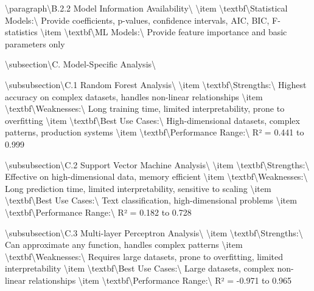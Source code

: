 \documentclass[11pt,a4paper]{article}
\begin{document}
\textbackslash{}paragraph\textbackslash{}{B.2.2 Model Information Availability\textbackslash{}}
\textbackslash{}item \textbackslash{}textbf\textbackslash{}{Statistical Models:\textbackslash{}} Provide coefficients, p-values, confidence intervals, AIC, BIC, F-statistics
\textbackslash{}item \textbackslash{}textbf\textbackslash{}{ML Models:\textbackslash{}} Provide feature importance and basic parameters only

\textbackslash{}subsection\textbackslash{}{C. Model-Specific Analysis\textbackslash{}}

\textbackslash{}subsubsection\textbackslash{}{C.1 Random Forest Analysis\textbackslash{}}
\textbackslash{}item \textbackslash{}textbf\textbackslash{}{Strengths:\textbackslash{}} Highest accuracy on complex datasets, handles non-linear relationships
\textbackslash{}item \textbackslash{}textbf\textbackslash{}{Weaknesses:\textbackslash{}} Long training time, limited interpretability, prone to overfitting
\textbackslash{}item \textbackslash{}textbf\textbackslash{}{Best Use Cases:\textbackslash{}} High-dimensional datasets, complex patterns, production systems
\textbackslash{}item \textbackslash{}textbf\textbackslash{}{Performance Range:\textbackslash{}} R² = 0.441 to 0.999

\textbackslash{}subsubsection\textbackslash{}{C.2 Support Vector Machine Analysis\textbackslash{}}
\textbackslash{}item \textbackslash{}textbf\textbackslash{}{Strengths:\textbackslash{}} Effective on high-dimensional data, memory efficient
\textbackslash{}item \textbackslash{}textbf\textbackslash{}{Weaknesses:\textbackslash{}} Long prediction time, limited interpretability, sensitive to scaling
\textbackslash{}item \textbackslash{}textbf\textbackslash{}{Best Use Cases:\textbackslash{}} Text classification, high-dimensional problems
\textbackslash{}item \textbackslash{}textbf\textbackslash{}{Performance Range:\textbackslash{}} R² = 0.182 to 0.728

\textbackslash{}subsubsection\textbackslash{}{C.3 Multi-layer Perceptron Analysis\textbackslash{}}
\textbackslash{}item \textbackslash{}textbf\textbackslash{}{Strengths:\textbackslash{}} Can approximate any function, handles complex patterns
\textbackslash{}item \textbackslash{}textbf\textbackslash{}{Weaknesses:\textbackslash{}} Requires large datasets, prone to overfitting, limited interpretability
\textbackslash{}item \textbackslash{}textbf\textbackslash{}{Best Use Cases:\textbackslash{}} Large datasets, complex non-linear relationships
\textbackslash{}item \textbackslash{}textbf\textbackslash{}{Performance Range:\textbackslash{}} R² = -0.971 to 0.965
\end{document}
